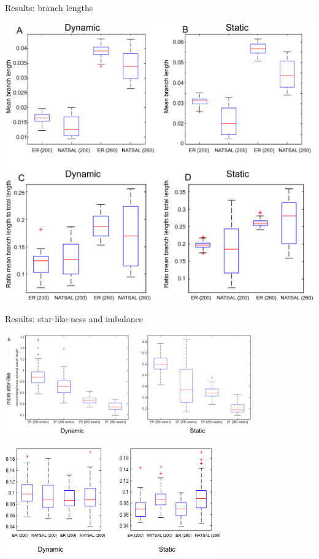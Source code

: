 \documentclass{beamer}
\begin{document}
\begin{frame}{Results: branch lengths}
    \begin{center}
        \vspace{-0.5cm}
        \includegraphics[height=0.8\textheight]{f6}
    \end{center}
\end{frame}

\begin{frame}{Results: star-like-ness and imbalance}
    \begin{center}
        \vspace{-0.5cm}
        \includegraphics[width=0.8\textwidth]{f7}

        \includegraphics[width=0.7\textwidth]{f8}
    \end{center}
\end{frame}
\end{document}
